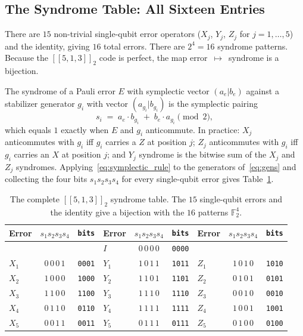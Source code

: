 \documentclass[11pt,a4paper]{article}
\theoremstyle{definition}
\newcommand{\Fbb}{\mathbb{F}}
\begin{document}
\subsection{The Syndrome Table: All Sixteen Entries}
\label{sec:513_table}

There are $15$ non-trivial single-qubit error operators ($X_j$, $Y_j$, $Z_j$ for $j=1,\dots,5$) and the identity, giving $16$ total errors. There are $2^4 = 16$ syndrome patterns. Because the $[\![5,1,3]\!]_2$ code is perfect, the map error~$\mapsto$~syndrome is a bijection.

The syndrome of a Pauli error $E$ with symplectic vector $(a_e|b_e)$ against a stabilizer generator $g_i$ with vector $(a_{g_i}|b_{g_i})$ is the symplectic pairing
\begin{equation}
  s_i \;=\; a_e\cdot b_{g_i} \;+\; b_e \cdot a_{g_i} \pmod 2 ,
  \label{eq:symplectic_rule}
\end{equation}
which equals $1$ exactly when $E$ and $g_i$ anticommute. In practice: $X_j$ anticommutes with $g_i$ iff $g_i$ carries a $Z$ at position $j$; $Z_j$ anticommutes with $g_i$ iff $g_i$ carries an $X$ at position $j$; and $Y_j$ syndrome is the bitwise sum of the $X_j$ and $Z_j$ syndromes. Applying~\eqref{eq:symplectic_rule} to the generators of~\eqref{eq:gens} and collecting the four bits $s_1 s_2 s_3 s_4$ for every single-qubit error gives Table~\ref{tab:syndromes513}.

\begin{table}[h]
\centering
\renewcommand{\arraystretch}{1.15}
\begin{tabular}{l c c | l c c | l c c}
\toprule
\textbf{Error} & $s_1s_2s_3s_4$ & \texttt{bits} &
\textbf{Error} & $s_1s_2s_3s_4$ & \texttt{bits} &
\textbf{Error} & $s_1s_2s_3s_4$ & \texttt{bits} \\
\midrule
& & & $I$ & $0\,0\,0\,0$ & \texttt{0000} & & & \\
\midrule
$X_1$  & $0\,0\,0\,1$ & \texttt{0001} &
$Y_1$  & $1\,0\,1\,1$ & \texttt{1011} &
$Z_1$  & $1\,0\,1\,0$ & \texttt{1010} \\
$X_2$  & $1\,0\,0\,0$ & \texttt{1000} &
$Y_2$  & $1\,1\,0\,1$ & \texttt{1101} &
$Z_2$  & $0\,1\,0\,1$ & \texttt{0101} \\
$X_3$  & $1\,1\,0\,0$ & \texttt{1100} &
$Y_3$  & $1\,1\,1\,0$ & \texttt{1110} &
$Z_3$  & $0\,0\,1\,0$ & \texttt{0010} \\
$X_4$  & $0\,1\,1\,0$ & \texttt{0110} &
$Y_4$  & $1\,1\,1\,1$ & \texttt{1111} &
$Z_4$  & $1\,0\,0\,1$ & \texttt{1001} \\
$X_5$  & $0\,0\,1\,1$ & \texttt{0011} &
$Y_5$  & $0\,1\,1\,1$ & \texttt{0111} &
$Z_5$  & $0\,1\,0\,0$ & \texttt{0100} \\
\bottomrule
\end{tabular}
\caption{The complete $[\![5,1,3]\!]_2$ syndrome table. The $15$ single-qubit errors and the identity give a bijection with the $16$ patterns $\Fbb_2^4$.}
\label{tab:syndromes513}
\end{table}
\end{document}
